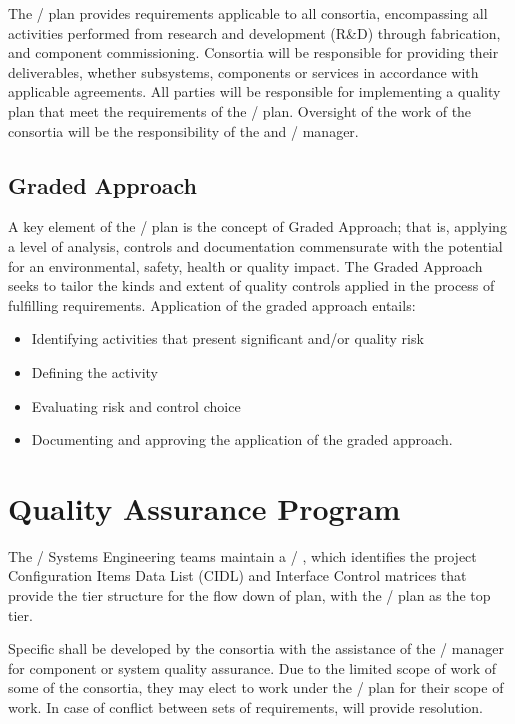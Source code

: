 The /  plan provides   requirements
applicable to all consortia, encompassing all activities performed
from research and development (R\&D) through fabrication, and component
commissioning. Consortia will be responsible for providing their
deliverables, whether subsystems, components or services in accordance
with applicable agreements. All parties will be responsible for
implementing a quality plan that meet the requirements of the
/  plan. Oversight of the work of the consortia will be
the responsibility of the   and /  manager.

\subsection{Graded Approach}

A key element of the /  plan is the concept of Graded
Approach; that is, applying a level of analysis, controls and
documentation commensurate with the potential for an environmental,
safety, health or quality impact. The Graded Approach seeks to tailor
the kinds and extent of quality controls applied in the process of
fulfilling requirements. Application of the graded approach entails:
\begin{itemize}
 \item Identifying activities that present significant  and/or quality risk
 \item Defining the activity
 \item Evaluating risk and control choice
 \item Documenting and approving the application of the graded approach.
\end{itemize}

\section{Quality Assurance Program}

The / Systems Engineering teams maintain a /
, which identifies the project
Configuration Items Data List (CIDL) and Interface Control matrices
that provide the tier structure for the flow down of  plan, with
the /  plan as the top tier.

Specific  shall be developed by the consortia with the
assistance of the /  manager for
component or system quality assurance. Due to the limited scope of
work of some of the consortia, they may elect to work under the
/  plan for their scope of work. In case of conflict between
sets of   requirements,   will provide
resolution.

